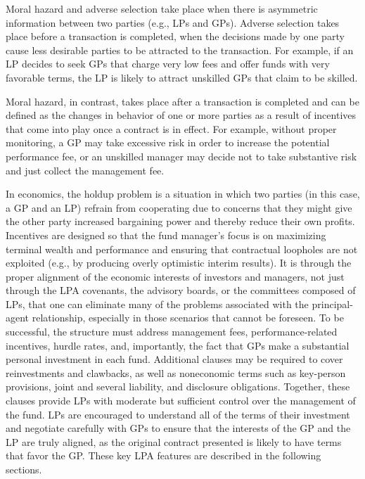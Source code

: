 \documentclass[11pt]{article}
\begin{document}
Moral hazard and adverse selection take place when there is asymmetric information between two parties (e.g., LPs and GPs). Adverse selection takes place before a transaction is completed, when the decisions made by one party cause less desirable parties to be attracted to the transaction. For example, if an LP decides to seek GPs that charge very low fees and offer funds with very favorable terms, the LP is likely to attract unskilled GPs that claim to be skilled.

Moral hazard, in contrast, takes place after a transaction is completed and can be defined as the changes in behavior of one or more parties as a result of incentives that come into play once a contract is in effect. For example, without proper monitoring, a GP may take excessive risk in order to increase the potential performance fee, or an unskilled manager may decide not to take substantive risk and just collect the management fee.

In economics, the holdup problem is a situation in which two parties (in this case, a GP and an LP) refrain from cooperating due to concerns that they might give the other party increased bargaining power and thereby reduce their own profits. Incentives are designed so that the fund manager's focus is on maximizing terminal wealth and performance and ensuring that contractual loopholes are not exploited (e.g., by producing overly optimistic interim results). It is through the proper alignment of the economic interests of investors and managers, not just through the LPA covenants, the advisory boards, or the committees composed of LPs, that one can eliminate many of the problems associated with the principal-agent relationship, especially in those scenarios that cannot be foreseen. To be successful, the structure must address management fees, performance-related incentives, hurdle rates, and, importantly, the fact that GPs make a substantial personal investment in each fund. Additional clauses may be required to cover reinvestments and clawbacks, as well as noneconomic terms such as key-person provisions, joint and several liability, and disclosure obligations. Together, these clauses provide LPs with moderate but sufficient control over the management of the fund. LPs are encouraged to understand all of the terms of their investment and negotiate carefully with GPs to ensure that the interests of the GP and the LP are truly aligned, as the original contract presented is likely to have terms that favor the GP. These key LPA features are described in the following sections.
\end{document}

